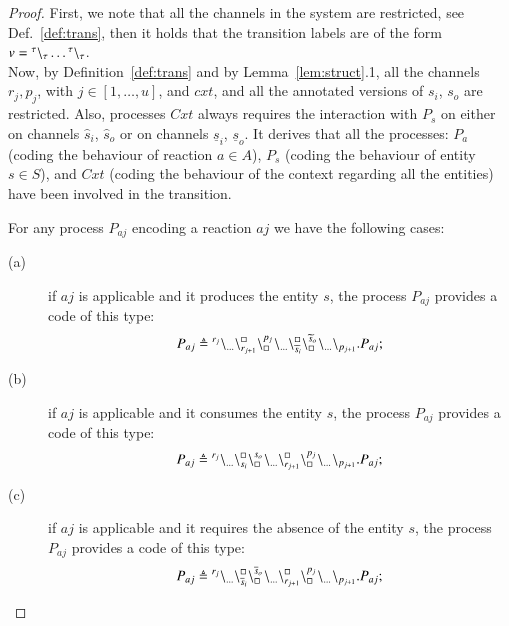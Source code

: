  \begin{proof}
 First, we note that all the channels in the system are restricted, see Def.~\ref{def:trans}, then
 it holds that the transition labels are of the form  $v={}^{\tau} \backslash_{\tau}\dots{}^{\tau} \backslash_{\tau}$.\\
 Now,
by Definition~\ref{def:trans} and by Lemma~\ref{lem:struct}.1, all the  channels $r_j,p_j$, with
 $j \in [1,\dots,u]$, and $cxt$,
  and all the annotated versions of 
 $s_i$, $s_o$ are restricted. Also, processes $\mathit{Cxt}$ always requires the 
 interaction with $P_s$ on either on channels $\widehat{s}_i$, $\widehat{s}_o$ or on channels 
 $\underline{s}_i$, $\underline{s}_o$.
 It derives that all the processes: $P_a$  (coding the behaviour of reaction $a \in A$), $P_s$ (coding the behaviour of entity $s \in S$), and $\mathit{Cxt}$ (coding the behaviour of the context regarding all the entities) have been involved in the transition. 

For any process $P_{aj}$ encoding a reaction $aj$ we have the following cases:
\begin{description}
\item[(a)] 
if $aj$ is applicable and it produces the entity $s$,  
the process $P_{aj}$ provides a code of this type:
$$P_{aj}\triangleq {}^{r_j} \backslash_{\dots}\backslash_{r_{j+1}}^{\scriptstyle {\square}}\backslash_{\scriptstyle {\square}}^{p_j}{}^{} \backslash_{\dots}\backslash_{\widetilde{s}_i}^{\scriptstyle {\square}}\backslash_{\scriptstyle {\square}}^{\widetilde{s}_o}{}^{} \backslash_{\dots} \backslash_{p_{j+1}}.P_{aj} ;$$

\item[(b)] 
 if $aj$ is applicable and it  consumes the entity $s$,
 the process $P_{aj}$ provides a code of this type: 
$$P_{aj}\triangleq {}^{r_j} \backslash_{\dots}\backslash_{s_i}^{\scriptstyle {\square}}\backslash_{\scriptstyle {\square}}^{s_o}{}^{} \backslash_{\dots} \backslash_{r_{j+1}}^{\scriptstyle {\square}}\backslash_{\scriptstyle {\square}}^{p_j}{}^{} \backslash_{\dots}{}^{} \backslash_{p_{j+1}}.P_{aj} ;$$

\item[(c)]  
 if $aj$ is applicable and it requires the absence of the entity $s$,
 the process $P_{aj}$  provides a code of this type: 
$$P_{aj}\triangleq {}^{r_j} \backslash_{\dots}\backslash_{\overline{s}_i}^{\scriptstyle {\square}}\backslash_{\scriptstyle {\square}}^{\overline{s}_o}{}^{} \backslash_{\dots} \backslash_{r_{j+1}}^{\scriptstyle {\square}}\backslash_{\scriptstyle {\square}}^{p_j}{}^{} \backslash_{\dots}{}^{} \backslash_{p_{j+1}}.P_{aj} ;$$


\end{description}
\end{proof}
